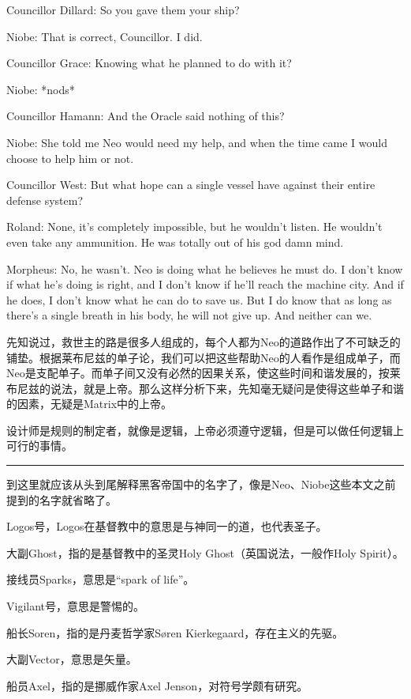 \documentclass[UTF8]{ctexart}
\newcommand{\myparsep}{\noindent \rule[0.5ex]{\linewidth}{1pt}}
\newenvironment{myquote}{\color{green} \setlength{\leftskip}{6em} \setlength{\rightskip}{4em} \setlength{\parindent}{-2em}}{\par}
\begin{document}
\begin{myquote}
Councillor Dillard: So you gave them your ship?

Niobe: That is correct, Councillor. I did.

Councillor Grace: Knowing what he planned to do with it?

Niobe: *nods*

Councillor Hamann: And the Oracle said nothing of this?

Niobe: She told me Neo would need my help, and when the time came I would choose to help him or not.

Councillor West: But what hope can a single vessel have against their entire defense system?

Roland: None, it's completely impossible, but he wouldn't listen. He wouldn't even take any ammunition. He was totally out of his god damn mind.

Morpheus: No, he wasn't. Neo is doing what he believes he must do. I don't know if what he's doing is right, and I don't know if he'll reach the machine city. And if he does, I don't know what he can do to save us. But I do know that as long as there's a single breath in his body, he will not give up. And neither can we.
\end{myquote}

先知说过，救世主的路是很多人组成的，每个人都为Neo的道路作出了不可缺乏的铺垫。根据莱布尼兹的单子论，我们可以把这些帮助Neo的人看作是组成单子，而Neo是支配单子。而单子间又没有必然的因果关系，使这些时间和谐发展的，按莱布尼兹的说法，就是上帝。那么这样分析下来，先知毫无疑问是使得这些单子和谐的因素，无疑是Matrix中的上帝。

设计师是规则的制定者，就像是逻辑，上帝必须遵守逻辑，但是可以做任何逻辑上可行的事情。

\myparsep

到这里就应该从头到尾解释黑客帝国中的名字了，像是Neo、Niobe这些本文之前提到的名字就省略了。

Logos号，Logos在基督教中的意思是与神同一的道，也代表圣子。

大副Ghost，指的是基督教中的圣灵Holy Ghost（英国说法，一般作Holy Spirit）。

接线员Sparks，意思是“spark of life”。

Vigilant号，意思是警惕的。

船长Soren，指的是丹麦哲学家Søren Kierkegaard，存在主义的先驱。

大副Vector，意思是矢量。

船员Axel，指的是挪威作家Axel Jenson，对符号学颇有研究。
\end{document}
